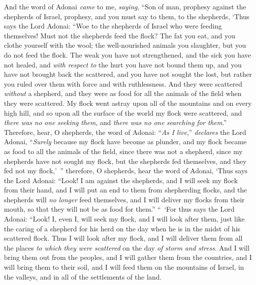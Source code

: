 \begin{biblechapter} %
 And the word of Adonai \textit{came} to me, \textit{saying},
\verse “Son of man, prophesy against the shepherds of Israel, prophesy, and you must say to them, to the shepherds, ‘Thus says the Lord Adonai: “Woe to the shepherds of Israel who were feeding themselves! Must not the shepherds feed the flock?
\verse The fat you eat, and you clothe yourself with the wool; the well-nourished animals you slaughter, but you do not feed the flock.
\verse The weak you have not strengthened, and the sick you have not healed, and \textit{with respect to} the hurt you have not bound them up, and you have not brought back the scattered, and you have not sought the lost, but rather you ruled over them with force and with ruthlessness.
\verse And they were scattered \textit{without} a shepherd, and they were as food for all the animals of the field when they were scattered.
\verse My flock went astray upon all of the mountains and on every high hill, and so upon all the surface of the world my flock were scattered, and \textit{there was no one seeking them}, and \textit{there was no one searching for them}.”
\verse Therefore, hear, O shepherds, the word of Adonai:
\verse “\textit{As I live},” \textit{declares} the Lord Adonai, “\textit{Surely} because my flock have become as plunder, and my flock became as food to all the animals of the field, since there was not a shepherd, since my shepherds have not sought my flock, but the shepherds fed themselves, and they fed not my flock,’ ”
\verse therefore, O shepherds, hear the word of Adonai,
\verse ‘Thus says the Lord Adonai: “Look! I am against the shepherds, and I will seek my flock from their hand, and I will put an end to them from shepherding flocks, and the shepherds will \textit{no longer} feed themselves, and I will deliver my flocks from their mouth, so that they will not be as food for them.”
\verse “ ‘For thus says the Lord Adonai: “Look! I, even I, will seek my flock, and I will look after them,
\verse just like the caring of a shepherd for his herd on the day when he is in the midst of his scattered flock. Thus I will look after my flock, and I will deliver them from all the places \textit{to which they were scattered} on the day \textit{of storm and stress}.
\verse And I will bring them out from the peoples, and I will gather them from the countries, and I will bring them to their soil, and I will feed them on the mountains of Israel, in the valleys, and in all of the settlements of the land.

\end{biblechapter}
